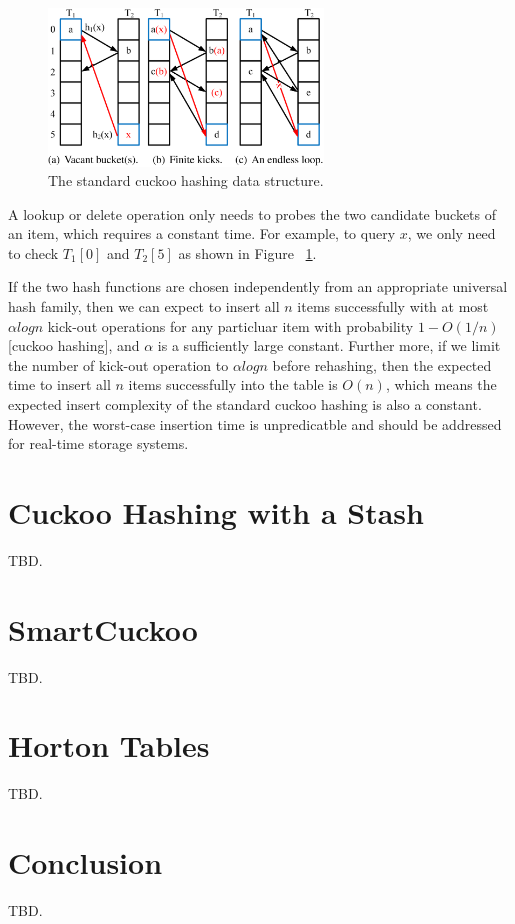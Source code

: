 \documentclass[runningheads]{llncs}
\begin{document}
\begin{figure}
    \centering
    \includegraphics[width=0.65\textwidth]{fig1.png}
    \caption{The standard cuckoo hashing data structure.
    } \label{fig:cuckoo}
\end{figure}

A lookup or delete operation only needs to probes the two candidate buckets of an item, which requires a constant time. For example, to query $x$, we only need to check $T_1[0]$ and $T_2[5]$ as shown in Figure ~\ref{fig:cuckoo}.

If the two hash functions are chosen independently from an appropriate universal hash family, then we can expect to insert all $n$ items successfully with at most $\alpha logn$ kick-out operations for any particluar item with probability $1-O(1/n)$[cuckoo hashing], and $\alpha$ is a sufficiently large constant. Further more, if we limit the number of kick-out operation to $\alpha logn$ before rehashing, then the expected time to insert all $n$ items successfully into the table is $O(n)$, which means the expected insert complexity of the standard cuckoo hashing is also a constant. However, the worst-case insertion time is unpredicatble and should be addressed for real-time storage systems.

\section{Cuckoo Hashing with a Stash}
\label{sec:chs}
TBD.
\section{SmartCuckoo}
\label{sec:smart}
TBD.
\section{Horton Tables}
\label{sec:horton}
TBD.
\section{Conclusion}
\label{sec:conclude}
TBD.
\end{document}
